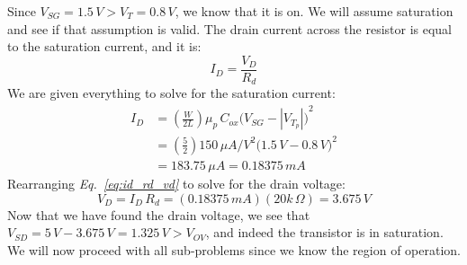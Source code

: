 \documentclass[12pt, fleqn]{article}
\begin{document}
Since $V_{SG} = 1.5\,V > V_T = 0.8\,V$, we know that it is on.  We will assume saturation and see if that assumption is valid.  The drain current across the resistor is equal to the saturation current, and it is:
    \begin{equation}
        I_D = \frac{V_D}{R_d}
        \label{eq:id_rd_vd}
    \end{equation}
We are given everything to solve for the saturation current:
    \begin{align*}
        I_{D} &= \left(\frac{W}{2L}\right) \mu_p\,C_{ox} {\big(V_{SG} - \left|V_{T_p}\right|\big)}^2\\[0.25cm]
        &= \left(\frac{5}{2}\right) 150\,\mu A/V^2 {\big(1.5\,V - 0.8\,V\big)}^2\\[0.25cm]
        &= 183.75\,\mu A = 0.18375\,mA
    \end{align*}
Rearranging \textit{Eq.~\ref{eq:id_rd_vd}} to solve for the drain voltage:
    \begin{equation}
        V_D = I_D\,R_d = (0.18375\,mA)(20k\,\Omega) = 3.675\,V
    \end{equation}
Now that we have found the drain voltage, we see that $V_{SD} = 5\,V - 3.675\,V = \boxed{1.325\,V} > V_{OV}$, and indeed the transistor is in saturation.  We will now proceed with all sub-problems since we know the region of operation.
\newpage
\end{document}
